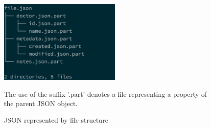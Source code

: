 \begin{figure}[H]
  \centering
  \includegraphics[width = 6cm]{images/json_file_structure.png} \\
  \caption{
  	JSON represented by file structure
  }{
    The use of the suffix '.part' denotes a file representing a property of the parent JSON object.
  }
  \label{fig:json_file_structure}
\end{figure}
